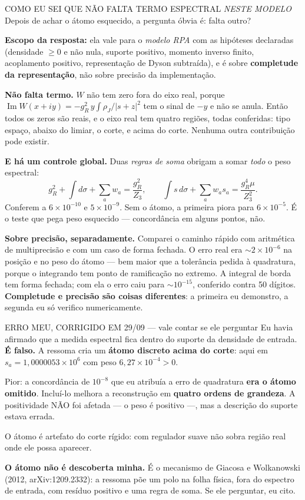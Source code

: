 \documentclass[11pt,a4paper]{article}
\begin{document}
\begin{caixa}{COMO EU SEI QUE N\~AO FALTA TERMO ESPECTRAL \emph{NESTE MODELO}}
Depois de achar o \'atomo esquecido, a pergunta \'obvia \'e: falta outro?

\textbf{Escopo da resposta:} ela vale para o \emph{modelo RPA} com as hip\'oteses
declaradas (densidade $\ge0$ e n\~ao nula, suporte positivo, momento inverso
finito, acoplamento positivo, representa\c{c}\~ao de Dyson subtra\'ida), e \'e sobre
\textbf{completude da representa\c{c}\~ao}, n\~ao sobre precis\~ao da implementa\c{c}\~ao.

\textbf{N\~ao falta termo.} $W$ n\~ao tem zero fora do eixo real, porque
$\operatorname{Im}W(x+iy)=-g_R^2\,y\int\rho_J/|s+z|^2$ tem o sinal de $-y$ e
n\~ao se anula. Ent\~ao todos os zeros s\~ao reais, e o eixo real tem quatro
regi\~oes, todas conferidas: tipo espa\c{c}o, abaixo do limiar, o corte, e acima do
corte. Nenhuma outra contribui\c{c}\~ao pode existir.

\textbf{E h\'a um controle global.} Duas \emph{regras de soma} obrigam a somar
\emph{todo} o peso espectral:
\[g_R^2+\int d\sigma+\sum_a w_a=\frac{g_R^2}{Z_3},\qquad
\int s\,d\sigma+\sum_a w_a s_a=\frac{g_R^4\mu}{Z_3^2}.\]
Conferem a $6\times10^{-10}$ e $5\times10^{-9}$. Sem o \'atomo, a primeira
piora para $6\times10^{-5}$. \'E o teste que pega peso esquecido --- concord\^ancia
em alguns pontos, n\~ao.

\textbf{Sobre precis\~ao, separadamente.} Comparei o caminho r\'apido com
aritm\'etica de multiprecis\~ao e com um caso de forma fechada. O erro real era
$\sim2\times10^{-6}$ na posi\c{c}\~ao e no peso do \'atomo --- bem maior que a
toler\^ancia pedida \`a quadratura, porque o integrando tem ponto de
ramifica\c{c}\~ao no extremo. A integral de borda tem forma fechada; com ela o
erro caiu para $\sim10^{-15}$, conferido contra 50 d\'igitos.
\textbf{Completude e precis\~ao s\~ao coisas diferentes}: a primeira eu
demonstro, a segunda eu s\'o verifico numericamente.
\end{caixa}

\begin{alerta}{ERRO MEU, CORRIGIDO EM 29/09 --- vale contar se ele perguntar}
Eu havia afirmado que a medida espectral fica dentro do suporte da densidade de
entrada. \textbf{\'E falso.} A ressoma cria um \textbf{\'atomo discreto acima do
corte}: aqui em $s_a=1{,}0000053\times10^6$ com peso $6{,}27\times10^{-4}>0$.

Pior: a concord\^ancia de $10^{-8}$ que eu atribu\'ia a erro de quadratura
\textbf{era o \'atomo omitido}. Inclu\'i-lo melhora a reconstru\c{c}\~ao em
\textbf{quatro ordens de grandeza}. A positividade N\~AO foi afetada --- o peso
\'e positivo ---, mas a descri\c{c}\~ao do suporte estava errada.

O \'atomo \'e artefato do corte r\'igido: com regulador suave n\~ao sobra
regi\~ao real onde ele possa aparecer.

\textbf{O \'atomo n\~ao \'e descoberta minha.} \'E o mecanismo de Giacosa e
Wolkanowski (2012, arXiv:1209.2332): a ressoma p\~oe um polo na folha f\'isica,
fora do espectro de entrada, com res\'iduo positivo e uma regra de soma. Se ele
perguntar, eu cito.
\end{alerta}
\end{document}

